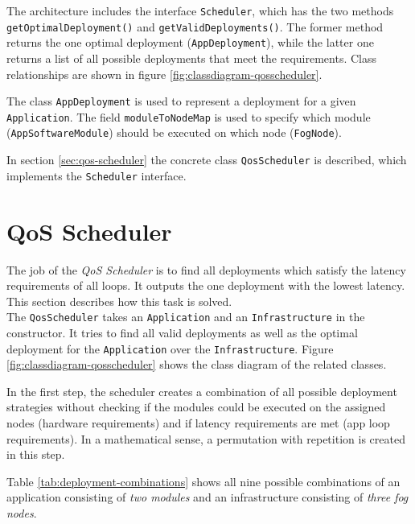 The architecture includes the interface \texttt{Scheduler}, which has the two methods \texttt{getOptimalDeployment()} and \texttt{getValidDeployments()}. The former method returns the one optimal deployment (\texttt{AppDeployment}), while the latter one returns a list of all possible deployments that meet the requirements. Class relationships are shown in figure \ref{fig:classdiagram-qosscheduler}.

The class \texttt{AppDeployment} is used to represent a deployment for a given \texttt{Application}. The field \texttt{moduleToNodeMap} is used to specify which module (\texttt{AppSoftwareModule}) should be executed on which node (\texttt{FogNode}).

In section \ref{sec:qos-scheduler} the concrete class \texttt{QosScheduler} is described, which implements the \texttt{Scheduler} interface.



\section{QoS Scheduler\label{sec:qos-scheduler}}
The job of the \textit{QoS Scheduler} is to find all deployments which satisfy the latency requirements of all loops.
It outputs the one deployment with the lowest latency.
This section describes how this task is solved.\\

The \texttt{QosScheduler} takes an \texttt{Application} and an \texttt{Infrastructure} in the constructor. It tries to find all valid deployments as well as the optimal deployment for the \texttt{Application} over the \texttt{Infrastructure}. Figure \ref{fig:classdiagram-qosscheduler} shows the class diagram of the related classes.

In the first step, the scheduler creates a combination of all possible deployment strategies without checking if the modules could be executed on the assigned nodes (hardware requirements) and if latency requirements are met (app loop requirements).
In a mathematical sense, a permutation with repetition is created in this step.

Table \ref{tab:deployment-combinations} shows all nine possible combinations of an application consisting of \textit{two modules} and an infrastructure consisting of \textit{three fog nodes}.

